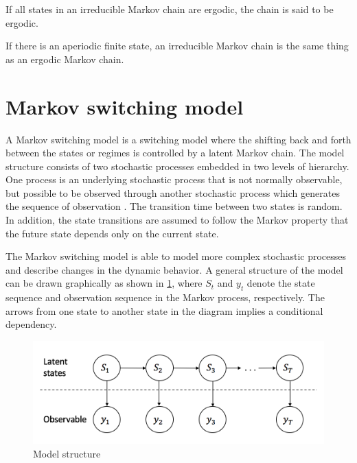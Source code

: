 \begin{thm*}
If all states in an irreducible Markov chain are ergodic, the chain
is said to be ergodic.
\end{thm*}

\begin{thm*}
\citep{manning2008introduction} If there is an aperiodic finite state,
an irreducible Markov chain is the same thing as an ergodic Markov
chain. 
\end{thm*}

\section{Markov switching model}

A Markov switching model is a switching model where the shifting back
and forth between the states or regimes is controlled by a latent
Markov chain. The model structure consists of two stochastic processes
embedded in two levels of hierarchy. One process is an underlying
stochastic process that is not normally observable, but possible to
be observed through another stochastic process which generates the
sequence of observation \citep{rabiner1986introduction}. The transition
time between two states is random. In addition, the state transitions
are assumed to follow the Markov property that the future state depends
only on the current state. 

The Markov switching model is able to model more complex stochastic
processes and describe changes in the dynamic behavior. A general
structure of the model can be drawn graphically as shown in \ref{msm},
where $S_{t}$ and $y_{t}$ denote the state sequence and observation
sequence in the Markov process, respectively. The arrows from one
state to another state in the diagram implies a conditional dependency. 

\begin{figure}[H]
\begin{centering}
\includegraphics[scale=0.6]{picture/msm1}
\par\end{centering}
\caption{Model structure}
\label{msm}
\end{figure}

